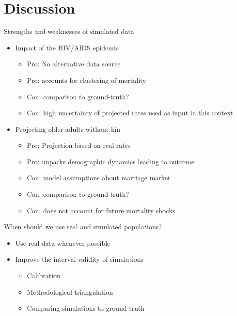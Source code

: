 \documentclass[
  ignorenonframetext,
]{beamer}
\providecommand{\tightlist}{%
  \setlength{\itemsep}{0pt}\setlength{\parskip}{0pt}}
\begin{document}
\hypertarget{discussion}{%
\section{Discussion}\label{discussion}}

\begin{frame}{Strengths and weaknesses of simulated data}
\protect\hypertarget{strengths-and-weaknesses-of-simulated-data}{}

\begin{itemize}
\tightlist
\item
  Impact of the HIV/AIDS epidemic

  \begin{itemize}
  \tightlist
  \item
    Pro: No alternative data source
  \item
    Pro: accounts for clustering of mortality
  \item
    Con: comparison to ground-truth?
  \item
    Con: high uncertainty of projected rates used as input in this
    context
  \end{itemize}
\item
  Projecting older adults without kin

  \begin{itemize}
  \tightlist
  \item
    Pro: Projection based on real rates
  \item
    Pro: unpacks demographic dynamics leading to outcome
  \item
    Con: model assumptions about marriage market
  \item
    Con: comparison to ground-truth?
  \item
    Con: does not account for future mortality shocks
  \end{itemize}
\end{itemize}

\end{frame}

\begin{frame}{When should we use real and simulated populations?}
\protect\hypertarget{when-should-we-use-real-and-simulated-populations}{}

\begin{itemize}
\tightlist
\item
  Use real data whenever possible
\item
  Improve the interval validity of simulations

  \begin{itemize}
  \tightlist
  \item
    Calibration
  \item
    Methodological triangulation
  \item
    Comparing simulations to ground-truth
  \end{itemize}
\end{itemize}

\end{frame}
\end{document}
